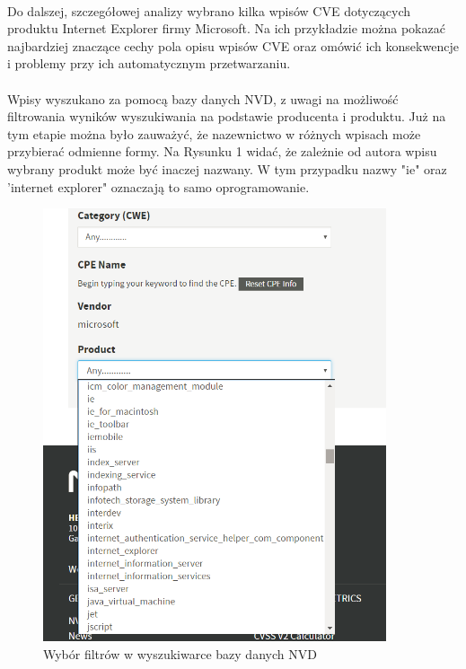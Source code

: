 \documentclass[a4paper,12pt,twoside]{article}
\begin{document}
\paragraph{}
Do dalszej, szczegółowej analizy wybrano kilka wpisów CVE dotyczących produktu Internet Explorer firmy Microsoft. Na ich przykładzie można pokazać najbardziej znaczące cechy pola opisu wpisów CVE oraz omówić ich konsekwencje i problemy przy ich automatycznym przetwarzaniu. 
\paragraph{}
Wpisy wyszukano za pomocą bazy danych NVD, z uwagi na możliwość filtrowania wyników wyszukiwania na podstawie producenta i produktu. Już na tym etapie można było zauważyć, że nazewnictwo w różnych wpisach może przybierać odmienne formy. Na Rysunku 1 widać, że zależnie od autora wpisu wybrany produkt może być inaczej nazwany. W tym przypadku nazwy "ie" oraz 'internet explorer" oznaczają to samo oprogramowanie. 

\begin{figure}
    \centering
    \includegraphics[width=0.9\textwidth]{image/001NVDSearchResults.png}
    \caption{Wybór filtrów w wyszukiwarce bazy danych NVD}
    \label{fig:Rysunek 1}
\end{figure}
\end{document}
